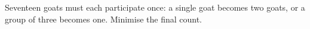 Seventeen goats must each participate once: a single goat becomes two goats, or a group of three becomes one. Minimise the final count.
